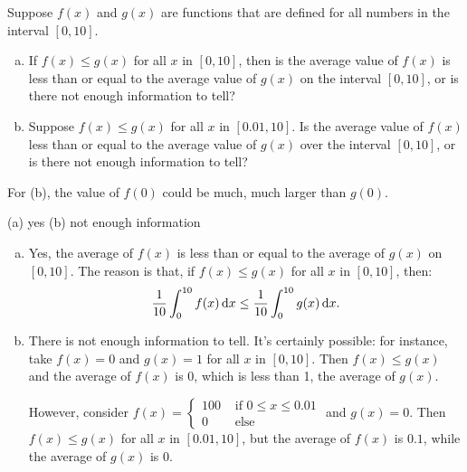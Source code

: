 \begin{Mquestion}
Suppose $f(x)$ and $g(x)$ are functions that are defined for all numbers in the interval $[0,10]$.
\begin{enumerate}[(a)]
\item  If $f(x) \leq g(x)$ for all $x$ in $[0,10]$, then is the average value of $f(x)$ is less than or equal to the average value of $g(x)$ on the interval $[0,10]$, or is there not enough information to tell?
\item Suppose $f(x) \leq g(x)$ for all $x$ in $[0.01,10]$. Is the average value of $f(x)$ less than or equal to the average value of $g(x)$ over the interval $[0,10]$, or is there not enough information to tell?
\end{enumerate}
\end{Mquestion}
\begin{hint}
For (b), the value of $f(0)$ could be much, much larger than $g(0)$.
\end{hint}
\begin{answer}
(a) yes \qquad (b) not enough information
\end{answer}
\begin{solution}
\begin{enumerate}[(a)]
\item Yes, the average of $f(x)$ is less than or equal to the average of $g(x)$ on $[0,10]$. The reason is that, if $f(x) \leq g(x)$ for all $x$ in $[0,10]$, then:
\[\frac{1}{10}\int_0^{10}f(x)\,\mathrm{d}x \leq \frac{1}{10}\int_0^{10}g(x)\,\mathrm{d}x.\]
\item There is not enough information to tell. It's certainly possible: for instance, take $f(x)=0$ and $g(x)=1$ for all $x$ in $[0,10]$. Then $f(x) \leq g(x)$ and the average of $f(x)$ is 0, which is less than 1, the average of $g(x)$.

However, consider $f(x) = \begin{cases}
100 & \text{ if } 0 \le x \le 0.01\\
0 & \text{ else }
\end{cases}$ and $g(x) = 0$. Then $f(x) \le g(x)$ for all $x$ in $[0.01,10]$, but the average of $f(x)$ is $0.1$, while the average of $g(x)$ is 0.
\end{enumerate}
\end{solution}


